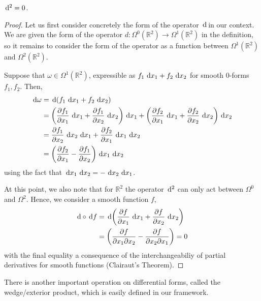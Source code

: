\begin{proposition}
	$ \operatorname{\, d\!}{}^2=0 $.
	\begin{proof}
		Let us first consider concretely the form of the operator $ \operatorname{\, d\!} $ in our
		context. We are given the form of the operator $ d: \Omega^0(\mathbb{R}^{2})
			\to \Omega^1(\mathbb{R}^{2}) $ in the definition, so it remains to consider
		the form of the operator as a function between $ \Omega^1(\mathbb{R}^{2}) $
		and $ \Omega^2(\mathbb{R}^{2}) $.

		Suppose that $ \omega \in \Omega^1(\mathbb{R}^{2}) $, expressible as $ f_1
			\operatorname{\, d\!}{x_1} + f_2 \operatorname{\, d\!}{x_2} $ for smooth $ 0 $-forms $ f_1,f_2 $. Then,
		\begin{align*}
			\d{\omega} & = \d \left( f_1 \d{x_1} + f_2 \d{x_2} \right)              \\
			           & = \left( \frac{\partial f_1}{\partial x_1}\d{x_1} +
			\frac{\partial f_1}{\partial x_2}\d{x_2} \right)\d{x_1} +
			\left( \frac{\partial f_2}{\partial x_1}\d{x_1} +
			\frac{\partial f_2}{\partial x_2}\d{x_2} \right)\d{x_2}                 \\
			           & = \frac{\partial f_1}{\partial x_2}\d{x_2}\d{x_1} +
			\frac{\partial f_2}{\partial x_1}\d{x_1}\d{x_2}                         \\
			           & = \left( \frac{\partial f_2}{\partial x_1}- \frac{\partial
				f_1}{\partial x_2} \right)\d{x_1}\d{x_2}
		\end{align*}
		using the fact that $ \operatorname{\, d\!}{x_1}\operatorname{\, d\!}{x_2}= -\operatorname{\, d\!}{x_2}\operatorname{\, d\!}{x_1} $.

		At this point, we also note that for $ \mathbb{R}^{2} $ the operator $
			\operatorname{\, d\!}{}^{2} $ can only act between $ \Omega^0 $ and $ \Omega^2 $. Hence, we
		consider a smooth function $ f $,
		\begin{align*}
			\operatorname{\, d\!}{} \circ \operatorname{\, d\!}{f} & = \operatorname{\, d\!} \left( \frac{\partial f}{\partial x_1}\operatorname{\, d\!}{x_1} +
			\frac{\partial f}{\partial x_2}\operatorname{\, d\!}{x_2} \right)                             \\
			                 & = \left( \frac{\partial f}{\partial x_1 \partial x_2} -
			\frac{\partial f}{\partial x_2 \partial x_1}\right) = 0
		\end{align*}
		with the final equality a consequence of the interchangeabiliy of partial
		derivatives for smooth functions (Clairaut's Theorem).
	\end{proof}
\end{proposition}

There is another important operation on differential forms, called the
wedge/exterior product, which is easily defined in our framework.

